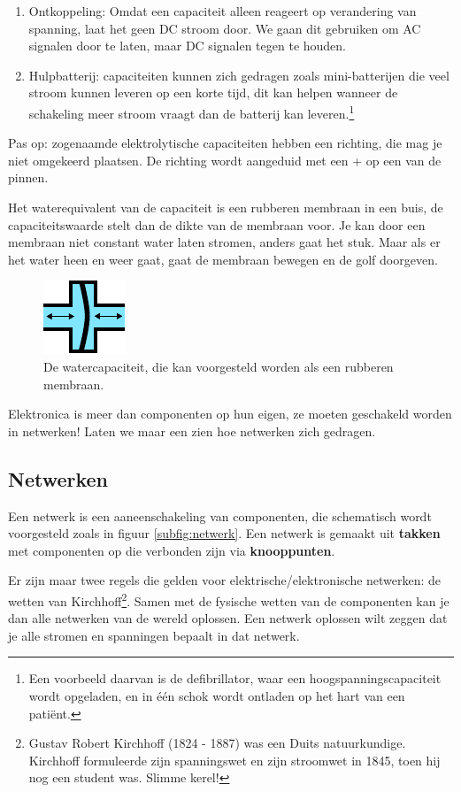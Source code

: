 \documentclass{article}
\begin{document}
		\begin{enumerate}
			\item Ontkoppeling: Omdat een capaciteit alleen reageert op verandering van spanning, laat het geen DC stroom door. We gaan dit gebruiken om AC signalen door te laten, maar DC signalen tegen te houden.
			\item Hulpbatterij: capaciteiten kunnen zich gedragen zoals mini-batterijen die veel stroom kunnen leveren op een korte tijd, dit kan helpen wanneer de schakeling meer stroom vraagt dan de batterij kan leveren.\footnote{ Een voorbeeld daarvan is de defibrillator, waar een hoogspanningscapaciteit wordt opgeladen, en in \'e\'en schok wordt ontladen op het hart van een pati\"ent.}
		\end{enumerate}
		Pas op: zogenaamde elektrolytische capaciteiten hebben een richting, die mag je niet omgekeerd plaatsen. De richting wordt aangeduid met een + op een van de pinnen.

		Het waterequivalent van de capaciteit is een rubberen membraan in een buis, de capaciteitswaarde stelt dan de dikte van de membraan voor. Je kan door een membraan niet constant water laten stromen, anders gaat het stuk. Maar als er het water heen en weer gaat, gaat de membraan bewegen en de golf doorgeven. 
		\begin{figure}[htbp]
				\centering
				\includegraphics{watercap}
				\caption{De watercapaciteit, die kan voorgesteld worden als een rubberen membraan.}
				\label{fig:watercap}
			\end{figure}

		Elektronica is meer dan componenten op hun eigen, ze moeten geschakeld worden in netwerken! Laten we maar een zien hoe netwerken zich gedragen.

		\subsection{Netwerken}

			Een netwerk is een aaneenschakeling van componenten, die schematisch wordt voorgesteld zoals in figuur \ref{subfig:netwerk}. Een netwerk is gemaakt uit \textbf{takken}  met componenten op die verbonden zijn via \textbf{knooppunten}. 

			 Er zijn maar twee regels die gelden voor elektrische/elektronische netwerken: de wetten van Kirchhoff\footnote{Gustav Robert Kirchhoff (1824 - 1887) was een Duits natuurkundige. Kirchhoff formuleerde zijn spanningswet en zijn stroomwet in 1845, toen hij nog een student was. Slimme kerel!}. Samen met de fysische wetten van de componenten kan je dan alle netwerken van de wereld oplossen. Een netwerk oplossen wilt zeggen dat je alle stromen en spanningen bepaalt in dat netwerk.
\end{document}
